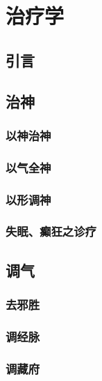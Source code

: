 \documentclass[
]{book}
\begin{document}
\chapter{治疗学}\label{ux6cbbux7597ux5b66}

\section*{引言}\label{ux5f15ux8a00-2}

\section{治神}\label{ux6cbbux795e}

\subsection{以神治神}\label{ux4ee5ux795eux6cbbux795e}

\subsection{以气全神}\label{ux4ee5ux6c14ux5168ux795e}

\subsection{以形调神}\label{ux4ee5ux5f62ux8c03ux795e}

\subsection{失眠、癫狂之诊疗}\label{ux5931ux7720ux766bux72c2ux4e4bux8bcaux7597}

\section{调气}\label{ux8c03ux6c14}

\subsection{去邪胜}\label{ux53bbux90aaux80dc}

\subsection{调经脉}\label{ux8c03ux7ecfux8109}

\subsection{调藏府}\label{ux8c03ux85cfux5e9c}
\end{document}
